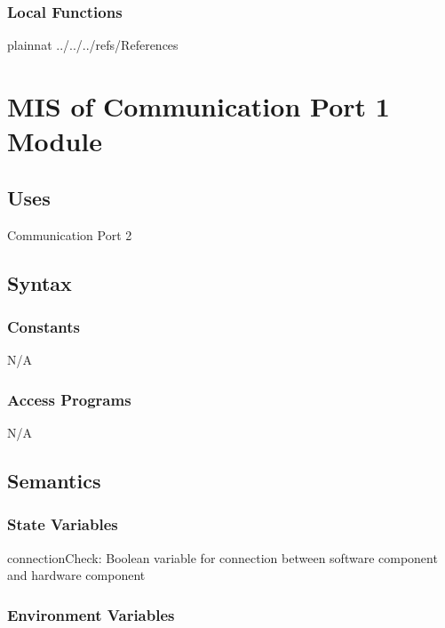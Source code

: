 \documentclass[12pt, titlepage]{article}
\begin{document}
\subsubsection{Local Functions}

 

\newpage

 {plainnat}
 {../../../refs/References}

\newpage

\section{MIS of Communication Port 1 Module} 



\subsection{Uses}
Communication Port 2

\subsection{Syntax}

\subsubsection{Constants}
N/A

\subsubsection{Access Programs}

N/A

\subsection{Semantics}

\subsubsection{State Variables}

connectionCheck: Boolean variable for connection between software component and hardware component

\subsubsection{Environment Variables}
\end{document}
